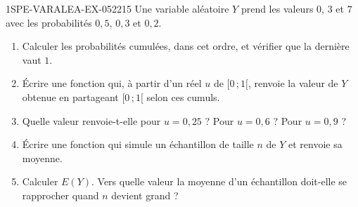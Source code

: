 \begin{exercice}{1SPE-VARALEA-EX-052}{2}{15}
Une variable aléatoire $Y$ prend les valeurs $0$, $3$ et $7$ avec les
probabilités $0{,}5$, $0{,}3$ et $0{,}2$.

\begin{enumerate}
  \item Calculer les probabilités cumulées, dans cet ordre, et vérifier que la
        dernière vaut $1$.
  \item Écrire une fonction  qui, à partir d'un réel
        $u$ de $[0\,;1[$, renvoie la valeur de $Y$ obtenue en partageant
        $[0\,;1[$ selon ces cumuls.
  \item Quelle valeur renvoie-t-elle pour $u = 0{,}25$ ? Pour $u = 0{,}6$ ?
        Pour $u = 0{,}9$ ?
  \item Écrire une fonction  qui simule
        un échantillon de taille $n$ de $Y$ et renvoie sa moyenne.
  \item Calculer $E(Y)$. Vers quelle valeur la moyenne d'un échantillon
        doit-elle se rapprocher quand $n$ devient grand ?
\end{enumerate}
\end{exercice}
